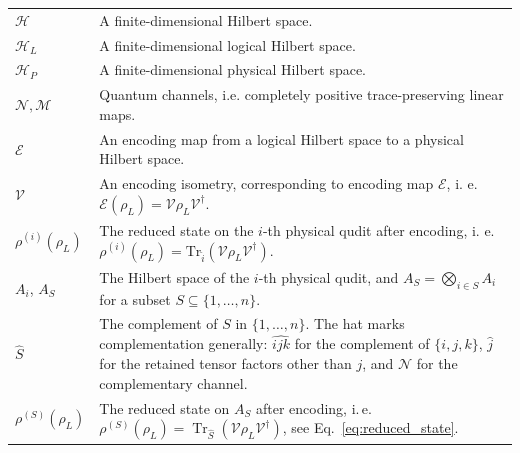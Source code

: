 \documentclass[11pt,letterpaper]{article}
\theoremstyle{plain}
\theoremstyle{plain}
\theoremstyle{plain}
\theoremstyle{plain}
\theoremstyle{plain}
\theoremstyle{plain}
\theoremstyle{plain}
\theoremstyle{definition}
\theoremstyle{plain}
\begin{document}
\begin{tabular}{@{}ll@{}}

\parbox[t]{0.22\textwidth}{$\mathcal{H}$} & \parbox[t]{0.72\textwidth}{A finite-dimensional Hilbert space.} \\[0.6em]

\parbox[t]{0.22\textwidth}{$\mathcal{H}_L$} & \parbox[t]{0.72\textwidth}{A finite-dimensional logical Hilbert space.} \\[0.6em]

\parbox[t]{0.22\textwidth}{$\mathcal{H}_P$} & \parbox[t]{0.72\textwidth}{A finite-dimensional physical Hilbert space.} \\[0.6em]

\parbox[t]{0.22\textwidth}{$\mathcal{N}, \mathcal{M}$} & \parbox[t]{0.72\textwidth}{Quantum channels, i.e. completely positive trace-preserving linear maps.} \\[0.6em]

\parbox[t]{0.22\textwidth}{$\mathcal{E}$} & \parbox[t]{0.72\textwidth}{An encoding map from a logical Hilbert space to a physical Hilbert space.} \\[0.6em]

\parbox[t]{0.22\textwidth}{$\mathcal{V}$} & \parbox[t]{0.72\textwidth}{An encoding isometry, corresponding to encoding map $\mathcal{E}$, i. e. $\mathcal{E}(\rho_L)=\mathcal{V}\rho_L\mathcal{V}^{\dagger}$.} \\[0.6em]

\parbox[t]{0.22\textwidth}{$\rho^{(i)}(\rho_L)$} & \parbox[t]{0.72\textwidth}{The reduced state on the $i$-th physical qudit after encoding, i. e. $\rho^{(i)}(\rho_L)=\mathrm{Tr}_{\hat{i}}(\mathcal{V}\rho_L\mathcal{V}^{\dagger})$.} \\[0.6em]

\parbox[t]{0.22\textwidth}{$A_i$, $A_S$} & \parbox[t]{0.72\textwidth}{The Hilbert space of the $i$-th physical qudit, and $A_S=\bigotimes_{i\in S}A_i$ for a subset $S\subseteq\{1,\ldots,n\}$.} \\[0.6em]

\parbox[t]{0.22\textwidth}{$\hat S$} & \parbox[t]{0.72\textwidth}{The complement of $S$ in $\{1,\ldots,n\}$. The hat marks complementation generally: $\widehat{ijk}$ for the complement of $\{i,j,k\}$, $\widehat j$ for the retained tensor factors other than $j$, and $\widehat{\mathcal N}$ for the complementary channel.} \\[0.6em]

\parbox[t]{0.22\textwidth}{$\rho^{(S)}(\rho_L)$} & \parbox[t]{0.72\textwidth}{The reduced state on $A_S$ after encoding, i.\,e. $\rho^{(S)}(\rho_L)=\operatorname{Tr}_{\hat S}(\mathcal{V}\rho_L\mathcal{V}^\dagger)$, see Eq.~\eqref{eq:reduced_state}.} \\[0.6em]


\end{tabular}
\end{document}
